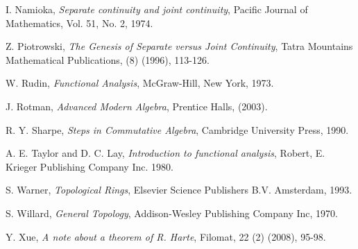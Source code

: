 \documentclass[12pt, oneside]{book}
\begin{document}
\begin{thebibliography}{99}
 I. Namioka, \textit{Separate continuity and joint continuity}, 
Pacific Journal of Mathematics, Vol. 51, No. 2, 1974.

 Z. Piotrowski, \textit{The Genesis of Separate versus Joint Continuity}, Tatra Mountains Mathematical Publications, (8) (1996), 113-126.

 W. Rudin, \textit{Functional Analysis}, McGraw-Hill, New York, 1973.

 J. Rotman, \textit{Advanced Modern Algebra}, Prentice Halls, (2003).

 R. Y. Sharpe, \textit{Steps in Commutative Algebra}, Cambridge University Press, 1990.

 A. E. Taylor and D. C. Lay,  \textit{Introduction to functional analysis}, Robert, E. Krieger Publishing Company Inc. 1980.

 S. Warner, \textit{Topological Rings}, Elsevier Science Publishers B.V. Amsterdam, 1993.

 S. Willard, \textit{General Topology}, Addison-Wesley Publishing Company Inc, 1970.

 Y. Xue, \textit{A note about a theorem of R. Harte}, Filomat, 22 (2) (2008), 95-98.


\end{thebibliography}
\end{document}
